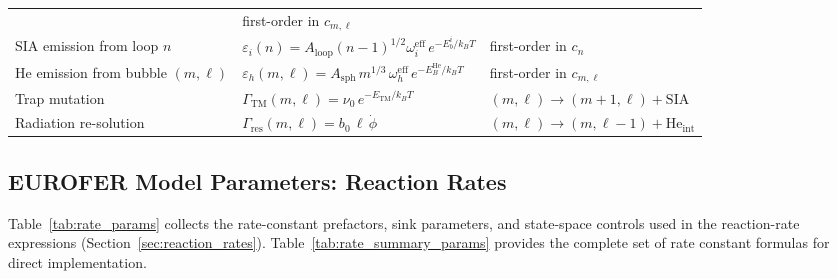 \begin{table}[htbp]
\begin{tabular}{@{}lll@{}}
  & first-order in $c_{m,\ell}$ \\[3pt]
SIA emission from loop $n$
  & $\varepsilon_i(n)=A_{\mathrm{loop}}(n-1)^{1/2}\omega_i^{\mathrm{eff}}\,e^{-E_b^i/k_BT}$
  & first-order in $c_n$ \\[3pt]
He emission from bubble $(m,\ell)$
  & $\varepsilon_h(m,\ell)=A_{\mathrm{sph}}\,m^{1/3}\,\omega_h^{\mathrm{eff}}\,e^{-E_B^{\mathrm{He}}/k_BT}$
  & first-order in $c_{m,\ell}$ \\[3pt]
Trap mutation
  & $\Gamma_{\mathrm{TM}}(m,\ell)=\nu_0\,e^{-E_{\mathrm{TM}}/k_BT}$
  & $(m,\ell) \to (m{+}1,\ell) + \mathrm{SIA}$ \\[3pt]
Radiation re-solution
  & $\Gamma_{\mathrm{res}}(m,\ell) = b_0\,\ell\,\dot{\phi}$
  & $(m,\ell) \to (m,\ell{-}1) + \mathrm{He}_{\mathrm{int}}$ \\
\bottomrule
\end{tabular}
\end{table}

\subsection{EUROFER Model Parameters: Reaction Rates}
\label{sec:params_reactions}

Table~\ref{tab:rate_params} collects the rate-constant prefactors, sink
parameters, and state-space controls used in the reaction-rate expressions
(Section~\ref{sec:reaction_rates}). Table~\ref{tab:rate_summary_params}
provides the complete set of rate constant formulas for direct implementation.

